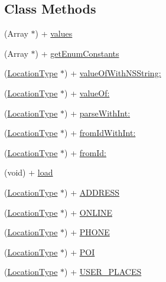 \subsection*{Class Methods}
\begin{DoxyCompactItemize}
\item 
(Array $\ast$) + \hyperlink{interface_location_type_a3d6720e66e587251717f6d70be135503}{values}
\item 
(Array $\ast$) + \hyperlink{interface_location_type_a11e1e5f294099bd9e9af005f71d64bc1}{get\+Enum\+Constants}
\item 
(\hyperlink{interface_location_type}{Location\+Type} $\ast$) + \hyperlink{interface_location_type_a40e353ecf6645f0362cfcf2346a30423}{value\+Of\+With\+N\+S\+String\+:}
\item 
(\hyperlink{interface_location_type}{Location\+Type} $\ast$) + \hyperlink{interface_location_type_ab4433d9a5a5300e709d6afbb6f403728}{value\+Of\+:}
\item 
(\hyperlink{interface_location_type}{Location\+Type} $\ast$) + \hyperlink{interface_location_type_a61afeecb291d55e53848d217546de51c}{parse\+With\+Int\+:}
\item 
(\hyperlink{interface_location_type}{Location\+Type} $\ast$) + \hyperlink{interface_location_type_a38fbf86b4fe654a47cbc0a6dfb8a5914}{from\+Id\+With\+Int\+:}
\item 
(\hyperlink{interface_location_type}{Location\+Type} $\ast$) + \hyperlink{interface_location_type_aaa9a9e3043cab130bdc476fa90118119}{from\+Id\+:}
\item 
(void) + \hyperlink{interface_location_type_a35b01b1aeedc19c8b0141da2c865d364}{load}
\item 
(\hyperlink{interface_location_type}{Location\+Type} $\ast$) + \hyperlink{interface_location_type_ae6603e29e5dbc97b363fa88c2a4cb96f}{A\+D\+D\+R\+E\+S\+S}
\item 
(\hyperlink{interface_location_type}{Location\+Type} $\ast$) + \hyperlink{interface_location_type_aac092d3b565fb6e7cb65cbe70b5af206}{O\+N\+L\+I\+N\+E}
\item 
(\hyperlink{interface_location_type}{Location\+Type} $\ast$) + \hyperlink{interface_location_type_ae5f6bd08c8b6736f10fbea57389e9f2e}{P\+H\+O\+N\+E}
\item 
(\hyperlink{interface_location_type}{Location\+Type} $\ast$) + \hyperlink{interface_location_type_adc2e914f4a7f9fe097c5a4a0a5cbac1a}{P\+O\+I}
\item 
(\hyperlink{interface_location_type}{Location\+Type} $\ast$) + \hyperlink{interface_location_type_ac32f0f845022e92a8312d0a6c796bda0}{U\+S\+E\+R\+\_\+\+P\+L\+A\+C\+E\+S}

\end{DoxyCompactItemize}

